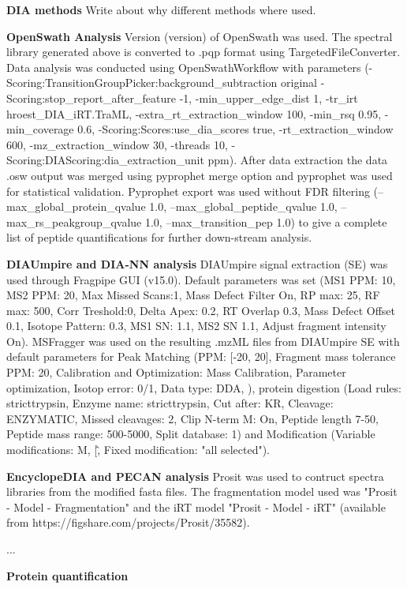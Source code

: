 \documentclass[10pt,letterpaper]{article}
\begin{document}
\textbf{DIA methods}
Write about why different methods where used.

\textbf{OpenSwath Analysis}
Version (version) of OpenSwath was used. The spectral library generated above is converted to .pqp format using TargetedFileConverter. Data analysis was conducted using OpenSwathWorkflow with parameters (-Scoring:TransitionGroupPicker:background\_subtraction original -Scoring:stop\_report\_after\_feature -1, -min\_upper\_edge\_dist 1, -tr\_irt hroest\_DIA\_iRT.TraML, -extra\_rt\_extraction\_window 100, -min\_rsq 0.95, -min\_coverage 0.6, -Scoring:Scores:use\_dia\_scores true, -rt\_extraction\_window 600, -mz\_extraction\_window 30, -threads 10, -Scoring:DIAScoring:dia\_extraction\_unit ppm). After data extraction the data .osw output was merged using pyprophet merge option and pyprophet was used for statistical validation. Pyprophet export was used without FDR filtering (--max\_global\_protein\_qvalue 1.0, --max\_global\_peptide\_qvalue 1.0, --max\_rs\_peakgroup\_qvalue 1.0, --max\_transition\_pep 1.0) to give a complete list of peptide quantifications for further down-stream analysis.

\textbf{DIAUmpire and DIA-NN analysis}
DIAUmpire signal extraction (SE) was used through Fragpipe GUI (v15.0). Default parameters was set (MS1 PPM: 10, MS2 PPM: 20, Max Missed Scans:1, Mass Defect Filter On, RP max: 25, RF max: 500, Corr Treshold:0, Delta Apex: 0.2, RT Overlap 0.3, Mass Defect Offset 0.1, Isotope Pattern: 0.3, MS1 SN: 1.1, MS2 SN 1.1, Adjust fragment intensity On). MSFragger was used on the resulting .mzML files from DIAUmpire SE with default parameters for Peak Matching (PPM: [-20, 20], Fragment mass tolerance PPM: 20, Calibration and Optimization: Mass Calibration, Parameter optimization, Isotop error: 0/1, Data type: DDA, ), protein digestion (Load rules: stricttrypsin, Enzyme name: stricttrypsin, Cut after: KR, Cleavage: ENZYMATIC, Missed cleavages: 2, Clip N-term M: On, Peptide length 7-50, Peptide mass range: 500-5000, Split database: 1) and Modification (Variable modifications: M, \/[\^, Fixed modification: "all selected"). 

\textbf{EncyclopeDIA and PECAN analysis}
Prosit was used to contruct spectra libraries from the modified fasta files. The fragmentation model used was "Prosit - Model - Fragmentation" and the iRT model "Prosit - Model - iRT" (available from https://figshare.com/projects/Prosit/35582).

...


\textbf{Protein quantification}
\end{document}
